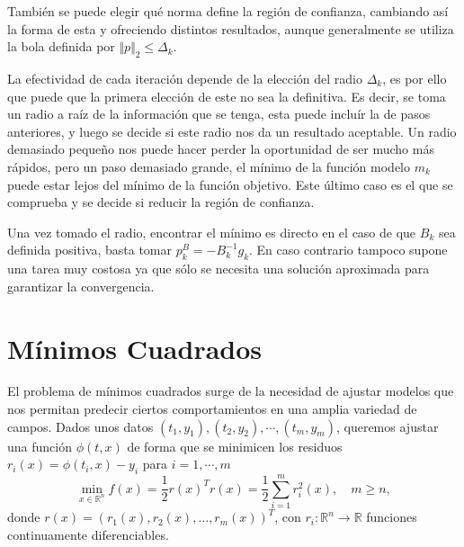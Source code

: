 \documentclass[11pt,a4paper]{book}
\theoremstyle{definition}
\theoremstyle{remark}
\begin{document}
También se puede elegir qué norma define la región de confianza, cambiando así la forma de esta y ofreciendo distintos resultados, aunque generalmente se utiliza la bola definida por $\Vert p \Vert_2 \leq \Delta_k$.

La efectividad de cada iteración depende de la elección del radio $\Delta_k$, es por ello que puede que la primera elección de este no sea la definitiva. Es decir, se toma un radio a raíz de la información que se tenga, esta puede incluír la de pasos anteriores, y luego se decide si este radio nos da un resultado aceptable. Un radio demasiado pequeño nos puede hacer perder la oportunidad de ser mucho más rápidos, pero un paso demasiado grande, el mínimo de la función modelo $m_k$ puede estar lejos del mínimo de la función objetivo. Este último caso es el que se comprueba y se decide si reducir la región de confianza.

Una vez tomado el radio, encontrar el mínimo es directo en el caso de que $B_k$ sea definida positiva, basta tomar $p_k^B = -B_k^{-1}g_k$. En caso contrario tampoco supone una tarea muy costosa ya que sólo se necesita una solución aproximada para garantizar la convergencia.


\chapter{Mínimos Cuadrados}

El problema de mínimos cuadrados surge de la necesidad de ajustar modelos que nos permitan predecir ciertos comportamientos en una amplia variedad de campos. Dados unos datos $(t_1,y_1),(t_2,y_2),\cdots,(t_m,y_m)$, queremos ajustar una función
$\phi(t,x)$ de forma que se minimicen los residuos $r_i(x) = \phi(t_i,x) - y_i$ para $i=1,\cdots,m$
\begin{equation}
	\min_{x\in \mathbb{R}^{n}}f(x) = \frac{1}{2} r(x)^Tr(x) = \frac{1}{2}\sum_{i=1}^{m}r_i^2(x), \quad m\geq n,
	\label{eq:lsp}
\end{equation}
donde $r(x) = (r_1(x), r_2(x), \ldots, r_m(x))^T$, con $r_i : \mathbb{R}^{n} \rightarrow \mathbb{R}$ funciones continuamente diferenciables. 

\end{document}

